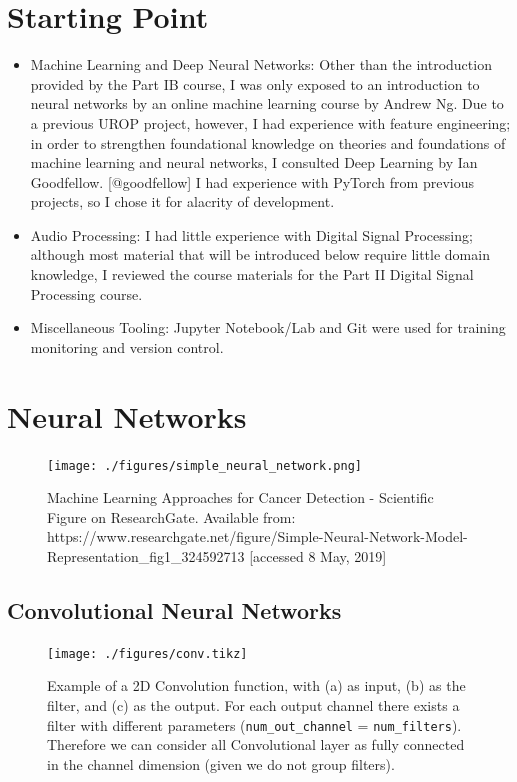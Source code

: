 \documentclass[]{report}
\begin{document}
\hypertarget{starting-point}{%
\section{Starting Point}\label{starting-point}}

\begin{itemize}
\item
  Machine Learning and Deep Neural Networks: Other than the introduction
  provided by the Part IB course, I was only exposed to an introduction
  to neural networks by an online machine learning course by Andrew Ng.
  Due to a previous UROP project, however, I had experience with feature
  engineering; in order to strengthen foundational knowledge on theories
  and foundations of machine learning and neural networks, I consulted
  Deep Learning by Ian Goodfellow. {[}@goodfellow{]} I had experience
  with PyTorch from previous projects, so I chose it for alacrity of
  development.
\item
  Audio Processing: I had little experience with Digital Signal
  Processing; although most material that will be introduced below
  require little domain knowledge, I reviewed the course materials for
  the Part II Digital Signal Processing course.
\item
  Miscellaneous Tooling: Jupyter Notebook/Lab and Git were used for
  training monitoring and version control.
\end{itemize}

\hypertarget{neural-networks}{%
\section{Neural Networks}\label{neural-networks}}

\begin{figure}[h]
    \texttt{[image: ./figures/simple\_neural\_network.png]}
\centering
\caption{Machine Learning Approaches for Cancer Detection - Scientific Figure on ResearchGate. Available from: https://www.researchgate.net/figure/Simple-Neural-Network-Model-Representation\_fig1\_324592713 [accessed 8 May, 2019]}
\end{figure}

\hypertarget{convolutional-neural-networks}{%
\subsection{Convolutional Neural
Networks}\label{convolutional-neural-networks}}

\begin{figure}[h]
    \texttt{[image: ./figures/conv.tikz]}
    \centering
    \caption{Example of a 2D Convolution function, with (a) as input, (b) as the filter, and (c) as the output. For each output channel there exists a filter with different parameters (\texttt{num\_out\_channel} = \texttt{num\_filters}). Therefore we can consider all Convolutional layer as fully connected in the channel dimension (given we do not group filters).}
\end{figure}
\end{document}
